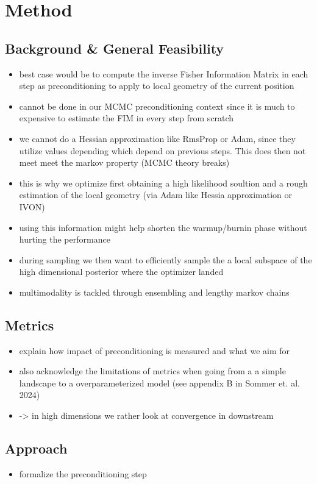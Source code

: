 \section{Method}\label{sec:method}
\subsection{Background \& General Feasibility}\label{sec:general_idea}

\begin{itemize}
    \item best case would be to compute the inverse Fisher Information Matrix in each step as preconditioning to apply to local geometry of the current position
    \item cannot be done in our MCMC preconditioning context since it is much to expensive to estimate the FIM in every step from scratch
    \item we cannot do a Hessian approximation like RmsProp or Adam, since they utilize values depending which depend on previous steps. This does then not meet meet the markov property (MCMC theory breaks)
    \item this is why we optimize first obtaining a high likelihood soultion and a rough estimation of the local geometry (via Adam like Hessia approximation or IVON)
    \item using this information might help shorten the warmup/burnin phase without hurting the performance
    \item during sampling we then want to efficiently sample the a local subspace of the high dimensional posterior where the optimizer landed
    \item multimodality is tackled through ensembling and lengthy markov chains
\end{itemize}

\subsection{Metrics}
\begin{itemize}
    \item explain how impact of preconditioning is measured and what we aim for
    \item also acknowledge the limitations of metrics when going from a a simple landscape to a overparameterized model (see appendix B in Sommer et. al. 2024)
    \item -> in high dimensions we rather look at convergence in downstream
\end{itemize}

\subsection{Approach}
\begin{itemize}
    \item formalize the preconditioning step
\end{itemize}

\newpage
